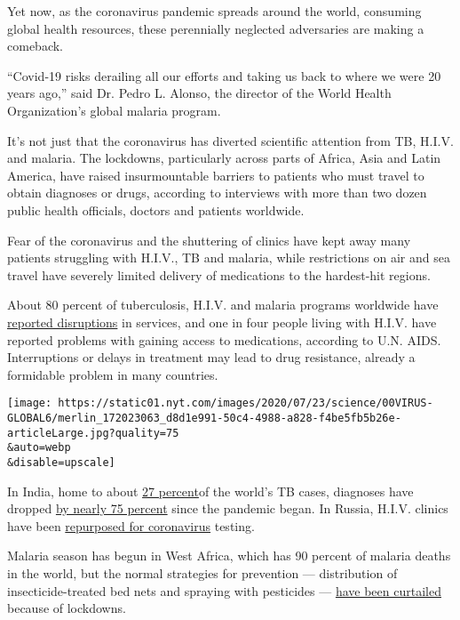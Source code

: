 Yet now, as the coronavirus pandemic spreads around the world, consuming
global health resources, these perennially neglected adversaries are
making a comeback.

``Covid-19 risks derailing all our efforts and taking us back to where
we were 20 years ago,'' said Dr. Pedro L. Alonso, the director of the
World Health Organization's global malaria program.

It's not just that the coronavirus has diverted scientific attention
from TB, H.I.V. and malaria. The lockdowns, particularly across parts of
Africa, Asia and Latin America, have raised insurmountable barriers to
patients who must travel to obtain diagnoses or drugs, according to
interviews with more than two dozen public health officials, doctors and
patients worldwide.

Fear of the coronavirus and the shuttering of clinics have kept away
many patients struggling with H.I.V., TB and malaria, while restrictions
on air and sea travel have severely limited delivery of medications to
the hardest-hit regions.

About 80 percent of tuberculosis, H.I.V. and malaria programs worldwide
have
\href{https://www.theglobalfund.org/en/covid-19/news/2020-06-17-global-fund-survey-majority-of-hiv-tb-and-malaria-programs-face-disruptions-as-a-result-of-covid-19/}{reported
disruptions} in services, and one in four people living with H.I.V. have
reported problems with gaining access to medications, according to U.N.
AIDS. Interruptions or delays in treatment may lead to drug resistance,
already a formidable problem in many countries.

\texttt{[image: https://static01.nyt.com/images/2020/07/23/science/00VIRUS-GLOBAL6/merlin\_172023063\_d8d1e991-50c4-4988-a828-f4be5fb5b26e-articleLarge.jpg?quality=75\\\&auto=webp\\\&disable=upscale]}

In India, home to about
\href{https://www.who.int/tb/publications/global_report/gtbr2018_main_text_28Feb2019.pdf}{27
percent}of the world's TB cases, diagnoses have dropped
\href{https://reports.nikshay.in/Reports/TBNotification}{by nearly 75
percent} since the pandemic began. In Russia, H.I.V. clinics have been
\href{https://www.unaids.org/en/resources/presscentre/featurestories/2020/may/20200514_russian-federation-covid19}{repurposed
for coronavirus} testing.

Malaria season has begun in West Africa, which has 90 percent of malaria
deaths in the world, but the normal strategies for prevention ---
distribution of insecticide-treated bed nets and spraying with
pesticides ---
\href{https://www.who.int/emergencies/diseases/novel-coronavirus-2019/question-and-answers-hub/q-a-detail/malaria-and-the-covid-19-pandemic}{have
been curtailed} because of lockdowns.

